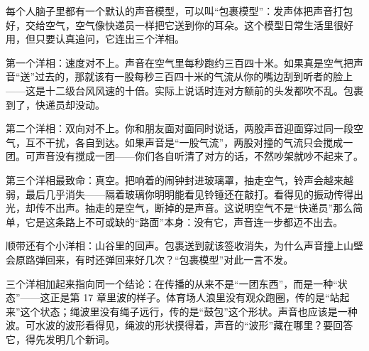 \begin{mainline}
每个人脑子里都有一个默认的声音模型，可以叫“包裹模型”：发声体把声音打包好，交给空气，空气像快递员一样把它送到你的耳朵。这个模型日常生活里很好用，但只要认真追问，它连出三个洋相。

第一个洋相：速度对不上。声音在空气里每秒跑约三百四十米。如果真是空气把声音“送”过去的，那就该有一股每秒三百四十米的气流从你的嘴边刮到听者的脸上——这是十二级台风风速的十倍。实际上说话时连对方额前的头发都吹不乱。包裹到了，快递员却没动。

第二个洋相：双向对不上。你和朋友面对面同时说话，两股声音迎面穿过同一段空气，互不干扰，各自到达。如果声音是“一股气流”，两股对撞的气流只会搅成一团。可声音没有搅成一团——你们各自听清了对方的话，不然吵架就吵不起来了。

第三个洋相最致命：真空。把响着的闹钟封进玻璃罩，抽走空气，铃声会越来越弱，最后几乎消失——隔着玻璃你明明能看见铃锤还在敲打。看得见的振动传得出光，却传不出声。抽走的是空气，断掉的是声音。这说明空气不是“快递员”那么简单，它是这条路上不可或缺的“路面”本身：没有它，声音连一步都迈不出去。

顺带还有个小洋相：山谷里的回声。包裹送到就该签收消失，为什么声音撞上山壁会原路弹回来，有时还弹回来好几次？“包裹模型”对此一言不发。

三个洋相加起来指向同一个结论：在传播的从来不是“一团东西”，而是一种“状态”——这正是第 17 章里波的样子。体育场人浪里没有观众跑圈，传的是“站起来”这个状态；绳波里没有绳子远行，传的是“鼓包”这个形状。声音也应该是一种波。可水波的波形看得见，绳波的形状摸得着，声音的“波形”藏在哪里？要回答它，得先发明几个新词。
\end{mainline}


